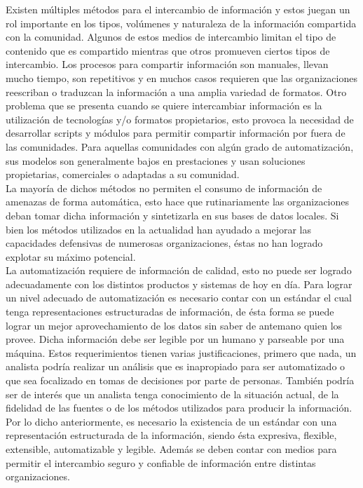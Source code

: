 Existen múltiples métodos para el intercambio de información y estos juegan un rol 
importante en los tipos, volúmenes y naturaleza de la información compartida 
con la comunidad. Algunos de estos medios de intercambio limitan el tipo de 
contenido que es compartido mientras que otros promueven ciertos tipos de 
intercambio. Los procesos para compartir información son manuales, llevan mucho 
tiempo, son repetitivos y en muchos casos requieren que las organizaciones 
reescriban o traduzcan la información a una amplia variedad de formatos. Otro 
problema que se presenta cuando se quiere intercambiar información es la 
utilización de tecnologías y/o formatos propietarios, esto provoca la necesidad 
de desarrollar scripts y módulos para permitir compartir información por fuera 
de las comunidades. Para aquellas comunidades con algún grado de automatización, 
sus modelos son generalmente bajos en prestaciones y usan soluciones 
propietarias, comerciales o adaptadas a su comunidad.\\

La mayoría de dichos 
métodos no permiten el consumo de información de amenazas de forma automática, 
esto hace que rutinariamente las organizaciones deban tomar dicha información y 
sintetizarla en sus bases de datos locales. Si bien los métodos utilizados en la 
actualidad han ayudado a mejorar las capacidades defensivas de numerosas 
organizaciones, éstas no han logrado explotar su máximo potencial.\\

La automatización requiere de información de calidad, esto 
no puede ser logrado adecuadamente con los distintos productos y sistemas de hoy en 
día. Para lograr un nivel adecuado de automatización es necesario contar con un 
estándar el cual tenga representaciones estructuradas de información, de ésta 
forma se puede lograr un mejor aprovechamiento de los datos sin saber de 
antemano quien los provee. Dicha información debe ser legible por un humano y 
parseable por una máquina. Estos requerimientos tienen varias justificaciones, 
primero que nada, un analista podría realizar un análisis que es inapropiado 
para ser automatizado o que sea focalizado en tomas de decisiones por parte de 
personas. También podría ser de interés que un analista tenga conocimiento de la 
situación actual,  de la fidelidad de las fuentes o de los métodos utilizados 
para producir la información. Por lo dicho anteriormente, es necesario la 
existencia de un estándar con una representación estructurada de la información, siendo ésta 
expresiva, flexible, extensible, automatizable y legible. Además se deben contar 
con medios para permitir el intercambio seguro y confiable de información entre 
distintas organizaciones.\\

